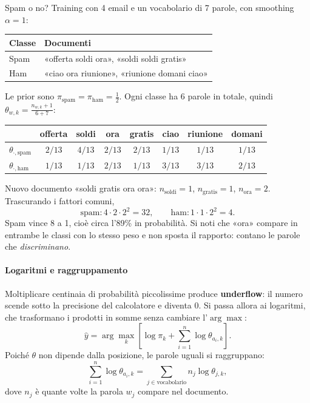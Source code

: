 \documentclass[12pt]{extarticle}
\begin{document}
\begin{esempiobox}{Spam o no?}
Training con 4 email e un vocabolario di 7 parole, con smoothing $\alpha=1$:
\begin{center}
\small
\begin{tabular}{ll}
    \toprule
    \textbf{Classe} & \textbf{Documenti} \\
    \midrule
    Spam & «offerta soldi ora», «soldi soldi gratis» \\
    Ham & «ciao ora riunione», «riunione domani ciao» \\
    \bottomrule
\end{tabular}
\end{center}
Le prior sono $\pi_{\text{spam}}=\pi_{\text{ham}}=\frac12$. Ogni classe ha 6 parole in totale, quindi $\theta_{w,k}=\frac{n_{w,k}+1}{6+7}$:
\begin{center}
\footnotesize
\setlength{\tabcolsep}{4pt}
\begin{tabular}{lccccccc}
    \toprule
    & offerta & soldi & ora & gratis & ciao & riunione & domani \\
    \midrule
    $\theta_{\cdot,\text{spam}}$ & $2/13$ & $4/13$ & $2/13$ & $2/13$ & $1/13$ & $1/13$ & $1/13$ \\
    $\theta_{\cdot,\text{ham}}$ & $1/13$ & $1/13$ & $2/13$ & $1/13$ & $3/13$ & $3/13$ & $2/13$ \\
    \bottomrule
\end{tabular}
\end{center}
Nuovo documento «soldi gratis ora ora»: $n_{\text{soldi}}=1$, $n_{\text{gratis}}=1$, $n_{\text{ora}}=2$. Trascurando i fattori comuni,
\[
\text{spam}: 4\cdot 2\cdot 2^2 = 32,
\qquad
\text{ham}: 1\cdot 1\cdot 2^2 = 4 .
\]
Spam vince 8 a 1, cioè circa l'89\% in probabilità. Si noti che «ora» compare in entrambe le classi con lo stesso peso e non sposta il rapporto: contano le parole che \emph{discriminano}.
\end{esempiobox}

\paragraph{Logaritmi e raggruppamento}
Moltiplicare centinaia di probabilità piccolissime produce \textbf{underflow}: il numero scende sotto la precisione del calcolatore e diventa 0. Si passa allora ai logaritmi, che trasformano i prodotti in somme senza cambiare l'$\arg\max$:
\[
\hat y = \arg\max_k \left[\log \pi_k + \sum_{i=1}^n \log \theta_{a_i,k}\right].
\]
Poiché $\theta$ non dipende dalla posizione, le parole uguali si raggruppano:
\[
\sum_{i=1}^n \log \theta_{a_i,k} = \sum_{j\in\text{vocabolario}} n_j \log \theta_{j,k},
\]
dove $n_j$ è quante volte la parola $w_j$ compare nel documento.
\end{document}
